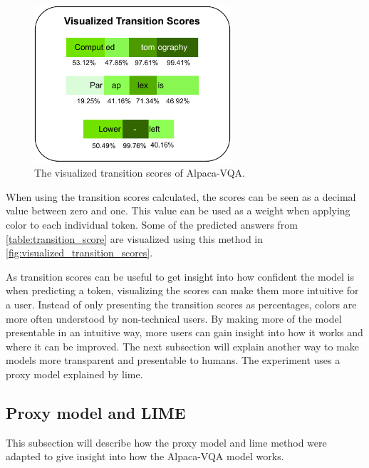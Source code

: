      \begin{figure}[htb]
        \centerline{
        \includegraphics[width=0.65\textwidth]{images/visualized_transition_scores.pdf}}
        \caption{The visualized transition scores of Alpaca-VQA.}
        \label{fig:visualized_transition_scores}
    \end{figure} 


    When using the transition scores calculated, the scores can be seen as a decimal value between zero and one. This value can be used as a weight when applying color to each individual token. Some of the predicted answers from \autoref{table:transition_score} are visualized using this method in \autoref{fig:visualized_transition_scores}.

    As transition scores can be useful to get insight into how confident the model is when predicting a token, visualizing the scores can make them more intuitive for a user. Instead of only presenting the transition scores as percentages, colors are more often understood by non-technical users. By making more of the model presentable in an intuitive way, more users can gain insight into how it works and where it can be improved. 
    The next subsection will explain another way to make models more transparent and presentable to humans. The experiment uses a proxy model explained by \gls{lime}. 
    
    
    
    \subsection{Proxy model and LIME}
    \label{sec4:proxy_lime}
    This subsection will describe how the proxy model and \gls{lime} method were adapted to give insight into how the Alpaca-VQA model works.
    
